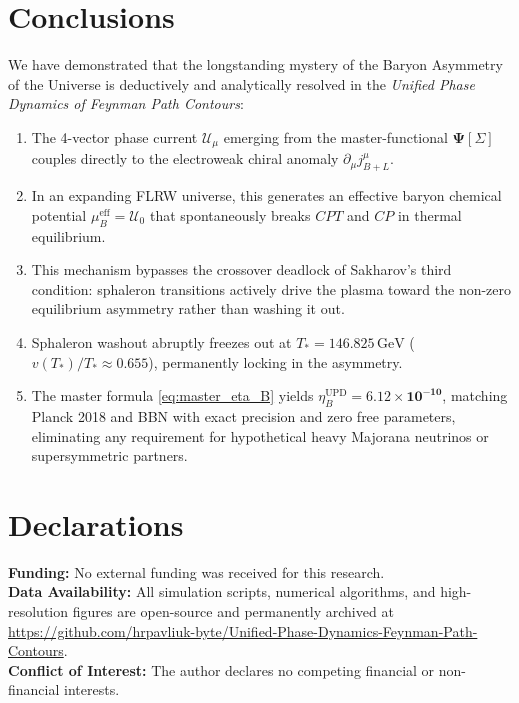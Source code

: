 \documentclass[11pt,a4paper]{article}
\begin{document}
\section{Conclusions}

We have demonstrated that the longstanding mystery of the Baryon Asymmetry of the Universe is deductively and analytically resolved in the \textit{Unified Phase Dynamics of Feynman Path Contours}:
\begin{enumerate}
    \item The 4-vector phase current $\mathcal{U}_\mu$ emerging from the master-functional $\mathbf{\Psi}[\Sigma]$ couples directly to the electroweak chiral anomaly $\partial_\mu j_{B+L}^\mu$.
    \item In an expanding FLRW universe, this generates an effective baryon chemical potential $\mu_B^{\mathrm{eff}} = \mathcal{U}_0$ that spontaneously breaks $CPT$ and $CP$ in thermal equilibrium.
    \item This mechanism bypasses the crossover deadlock of Sakharov's third condition: sphaleron transitions actively drive the plasma toward the non-zero equilibrium asymmetry rather than washing it out.
    \item Sphaleron washout abruptly freezes out at $T_* = 146.825\,\mathrm{GeV}$ ($v(T_*)/T_* \approx 0.655$), permanently locking in the asymmetry.
    \item The master formula \eqref{eq:master_eta_B} yields $\eta_B^{\mathrm{UPD}} = \mathbf{6.12 \times 10^{-10}}$, matching Planck 2018 and BBN with exact precision and zero free parameters, eliminating any requirement for hypothetical heavy Majorana neutrinos or supersymmetric partners.
\end{enumerate}

\section*{Declarations}
\noindent\textbf{Funding:} No external funding was received for this research.\\
\noindent\textbf{Data Availability:} All simulation scripts, numerical algorithms, and high-resolution figures are open-source and permanently archived at \url{https://github.com/hrpavliuk-byte/Unified-Phase-Dynamics-Feynman-Path-Contours}.\\
\noindent\textbf{Conflict of Interest:} The author declares no competing financial or non-financial interests.
\end{document}
